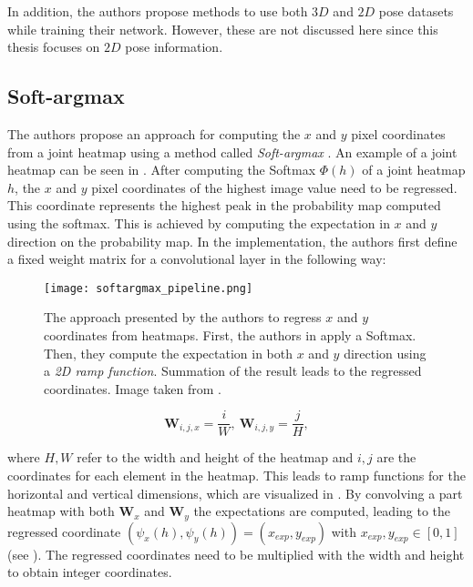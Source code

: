 In addition, the authors propose methods to use both $3D$ and $2D$ pose datasets while training their network.
However, these are not discussed here since this thesis focuses on $2D$ pose information. 

\subsection{Soft-argmax}
\label{sec:softargmax}
The authors propose an approach for computing the $x$ and $y$ pixel coordinates from a joint heatmap using a method called \textit{Soft-argmax} \cite{luvizon_human_2017}.
An example of a joint heatmap can be seen in .
After computing the Softmax $\Phi(h)$ of a joint heatmap $h$, the $x$ and $y$ pixel coordinates of the highest image value need to be regressed.
This coordinate represents the highest peak in the probability map computed using the softmax.
This is achieved by computing the expectation in $x$ and $y$ direction on the probability map.
In the implementation, the authors first define a fixed weight matrix for a convolutional layer in the following way:

\begin{figure}[htb!]
    \centering
    \texttt{[image: softargmax\_pipeline.png]}
    \caption{The approach presented by the authors to regress $x$ and $y$ coordinates from heatmaps. First, the authors in \cite{luvizon_2d/3d_2018} apply a Softmax. Then, they compute the expectation in both $x$ and $y$ direction using a \textit{2D ramp function}. Summation of the result leads to the regressed coordinates. Image taken from \cite{luvizon_2d/3d_2018}. }
    \label{fig:softargmax_pipeline}
\end{figure}

\begin{equation}
    \bm{W}_{i,j,x} = \frac{i}{W}, ~ \bm{W}_{i,j,y} = \frac{j}{H},
\end{equation}

where $H, W$ refer to the width and height of the heatmap and $i,j$ are the coordinates for each element in the heatmap.
This leads to ramp functions for the horizontal and vertical dimensions, which are visualized in .
By convolving a part heatmap with both $\bm{W}_x$ and $\bm{W}_y$ the expectations are computed, leading to the regressed coordinate $(\psi_x(h), \psi_y(h)) = (x_{exp}, y_{exp})$ with $x_{exp}, y_{exp} \in [0,1]$ (see ).
The regressed coordinates need to be multiplied with the width and height to obtain integer coordinates.

